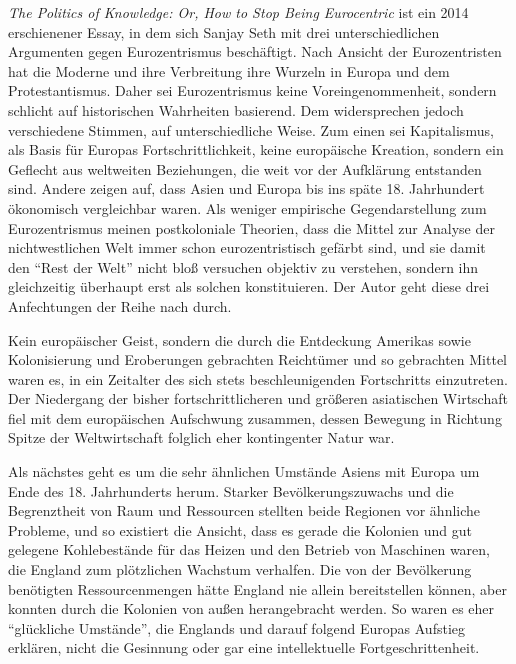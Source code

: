 \documentclass[a4paper, 12pt]{article}
\begin{document}
\begin{onehalfspace} 





\noindent 
\emph{The Politics of Knowledge: Or, How to Stop Being Eurocentric} ist ein 2014 erschienener Essay, in dem sich Sanjay Seth mit drei unterschiedlichen Argumenten gegen Eurozentrismus beschäftigt. Nach Ansicht der Eurozentristen hat die Moderne und ihre Verbreitung ihre Wurzeln in Europa und dem Protestantismus. Daher sei Eurozentrismus keine Voreingenommenheit, sondern schlicht auf historischen Wahrheiten basierend. Dem widersprechen jedoch verschiedene Stimmen, auf unterschiedliche Weise. Zum einen sei Kapitalismus, als Basis für Europas Fortschrittlichkeit, keine europäische Kreation, sondern ein Geflecht aus weltweiten Beziehungen, die weit vor der Aufklärung entstanden sind. Andere zeigen auf, dass Asien und Europa bis ins späte 18. Jahrhundert ökonomisch vergleichbar waren. Als weniger empirische Gegendarstellung zum Eurozentrismus meinen postkoloniale Theorien, dass die Mittel zur Analyse der nichtwestlichen Welt immer schon eurozentristisch gefärbt sind, und sie damit den “Rest der Welt” nicht bloß versuchen objektiv zu verstehen, sondern ihn gleichzeitig überhaupt erst als solchen konstituieren. Der Autor geht diese drei Anfechtungen der Reihe nach durch. 

Kein europäischer Geist, sondern die durch die Entdeckung Amerikas sowie Kolonisierung und Eroberungen gebrachten Reichtümer und so gebrachten Mittel waren es, in ein Zeitalter des sich stets beschleunigenden Fortschritts einzutreten. Der Niedergang der bisher fortschrittlicheren und größeren asiatischen Wirtschaft fiel mit dem europäischen Aufschwung zusammen, dessen Bewegung in Richtung Spitze der Weltwirtschaft folglich eher kontingenter Natur war.

Als nächstes geht es um die sehr ähnlichen Umstände Asiens mit Europa um Ende des 18. Jahrhunderts herum. Starker Bevölkerungszuwachs und die Begrenztheit von Raum und Ressourcen stellten beide Regionen vor ähnliche Probleme, und so existiert die Ansicht, dass es gerade die Kolonien und gut gelegene Kohlebestände für das Heizen und den Betrieb von Maschinen waren, die England zum plötzlichen Wachstum verhalfen. Die von der Bevölkerung benötigten Ressourcenmengen hätte England nie allein bereitstellen können, aber konnten durch die Kolonien von außen herangebracht werden. So waren es eher “glückliche Umstände”, die Englands und darauf folgend Europas Aufstieg erklären, nicht die Gesinnung oder gar eine  intellektuelle Fortgeschrittenheit. 


\end{onehalfspace}
\end{document}

